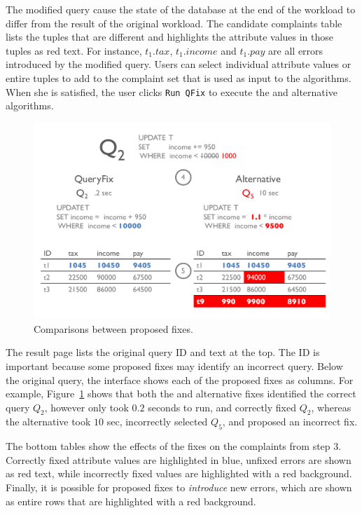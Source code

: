 The modified query cause the state of the database at the end of the workload
to differ from the result of the original workload.  The candidate complaints table lists the tuples
that are different and highlights the attribute values in those tuples as red text.  For instance,
$t_1.tax$, $t_1.income$ and $t_1.pay$ are all errors introduced by the modified query. 
Users can select individual attribute values or entire tuples to add to the complaint set that is used as input to the \sys algorithms.  
When she is satisfied, the user clicks \texttt{Run QFix} to execute the \sys and alternative algorithms.


\begin{figure}[t]
\centering
  \includegraphics[width = .95\columnwidth]{figures/demo2_exp2}
  \caption{Comparisons between proposed fixes.}
  \label{f:demo2} 
\end{figure}

  The result page lists the original query ID and text at the top.  The ID 
is important because some proposed fixes may identify an incorrect query.  Below the original query,
the interface shows each of the proposed fixes as columns.  For example, Figure~\ref{f:demo2} shows 
that both the \sys and alternative fixes identified the correct query $Q_2$, however \sys only took $0.2$ seconds
to run, and correctly fixed $Q_2$, whereas the alternative took $10$ sec, 
incorrectly selected $Q_5$, and proposed an incorrect fix.

 The bottom tables show the effects of the fixes on the complaints from
step 3.  Correctly fixed attribute values are highlighted in blue, unfixed errors are shown as red text, while incorrectly
fixed values are highlighted with a red background.  Finally, it is possible for proposed fixes to 
{\it introduce} new errors, which are shown as entire rows that are highlighted with a red background.







